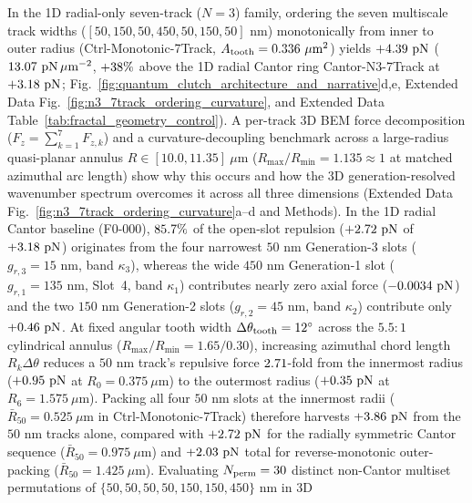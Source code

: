 \documentclass[pdflatex,sn-nature]{sn-jnl}
\DeclareRobustCommand{\roundzero}[1]{\fpeval{round(#1,0)}}
\DeclareRobustCommand{\roundone}[1]{\fpeval{round(#1,1)}}
\DeclareRobustCommand{\roundtwo}[1]{\fpeval{round(#1,2)}}
\DeclareRobustCommand{\roundthree}[1]{\fpeval{round(#1,3)}}
\DeclareRobustCommand{\roundfour}[1]{\fpeval{round(#1,4)}}
\begin{document}
In the 1D radial-only seven-track ($N=3$) family, ordering the seven multiscale track widths ($[50, 150, 50, 450, 50, 150, 50]\text{ nm}$) monotonically from inner to outer radius (Ctrl-Monotonic-7Track, $A_{\rm tooth} = \roundthree{\NatureCtrlNthreeMonotonicseventrackFullToothPlanformAreaUmtwo}\ \mu\text{m}^2$) yields $+\roundtwo{\NthreeCurvCylMonotonicFzPn}\text{ pN}$ ($\roundtwo{\NatureCtrlNthreeMonotonicseventrackFRepPnPerToothAreaUmtwo}\text{ pN}\,\mu\text{m}^{-2}$, $+\roundone{\NthreeCurvCylMonoVsCantorPct}\%$ above the 1D radial Cantor ring Cantor-N3-7Track at $+\roundtwo{\FractalNthreeCantorseventrackBemThetathreeFZPn}\text{ pN}$; Fig.~\ref{fig:quantum_clutch_architecture_and_narrative}d,e, Extended Data Fig.~\ref{fig:n3_7track_ordering_curvature}, and Extended Data Table~\ref{tab:fractal_geometry_control}). A per-track 3D BEM force decomposition ($F_z = \sum_{k=1}^7 F_{z,k}$) and a curvature-decoupling benchmark across a large-radius quasi-planar annulus $R \in [10.0, 11.35]\ \mu\text{m}$ ($R_{\max}/R_{\min} = 1.135 \approx 1$ at matched azimuthal arc length) show why this occurs and how the 3D generation-resolved wavenumber spectrum overcomes it across all three dimensions (Extended Data Fig.~\ref{fig:n3_7track_ordering_curvature}a--d and Methods). In the 1D radial Cantor baseline (F0-000), $\roundone{\fpeval{100*\NthreeUnithreedGenthreeFzerozerozeroPn/\NthreeUnithreedFzerozerozeroFzPn}}\%$ of the open-slot repulsion ($+\roundtwo{\NthreeUnithreedGenthreeFzerozerozeroPn}\text{ pN}$ of $+\roundtwo{\NthreeUnithreedFzerozerozeroFzPn}\text{ pN}$) originates from the four narrowest $50\text{ nm}$ Generation-3 slots ($g_{r,3}=15\text{ nm}$, band $\kappa_3$), whereas the wide $450\text{ nm}$ Generation-1 slot ($g_{r,1}=135\text{ nm}$, Slot~4, band $\kappa_1$) contributes nearly zero axial force ($\roundfour{\NthreeUnithreedSlotfourFzerozerozeroPn}\text{ pN}$) and the two $150\text{ nm}$ Generation-2 slots ($g_{r,2}=45\text{ nm}$, band $\kappa_2$) contribute only $+\roundtwo{\NthreeUnithreedGentwoFzerozerozeroPn}\text{ pN}$. At fixed angular tooth width $\Delta\theta_{\rm tooth}=12^\circ$ across the $5.5:1$ cylindrical annulus ($R_{\max}/R_{\min} = 1.65/0.30$), increasing azimuthal chord length $R_k\Delta\theta$ reduces a $50\text{ nm}$ track's repulsive force $\roundtwo{\fpeval{\NthreeCurvCylFivezeronmInnerFzPn/\NthreeCurvCylFivezeronmOuterFzPn}}$-fold from the innermost radius ($+\roundtwo{\NthreeCurvCylFivezeronmInnerFzPn}\text{ pN}$ at $R_0 = 0.375\ \mu\text{m}$) to the outermost radius ($+\roundtwo{\NthreeCurvCylFivezeronmOuterFzPn}\text{ pN}$ at $R_6 = 1.575\ \mu\text{m}$). Packing all four $50\text{ nm}$ slots at the innermost radii ($\bar{R}_{50} = 0.525\ \mu\text{m}$ in Ctrl-Monotonic-7Track) therefore harvests $+\roundtwo{\NthreeCurvCylMonotonicFivezeronmSumPn}\text{ pN}$ from the $50\text{ nm}$ tracks alone, compared with $+\roundtwo{\NthreeUnithreedGenthreeFzerozerozeroPn}\text{ pN}$ for the radially symmetric Cantor sequence ($\bar{R}_{50} = 0.975\ \mu\text{m}$) and $+\roundtwo{\NthreeCurvCylRevMonotonicFzPn}\text{ pN}$ total for reverse-monotonic outer-packing ($\bar{R}_{50} = 1.425\ \mu\text{m}$). Evaluating $N_{\rm perm} = \roundzero{\NthreePermNEvaluated}$ distinct non-Cantor multiset permutations of $\{50, 50, 50, 50, 150, 150, 450\}\text{ nm}$ in 3D 
\end{document}
